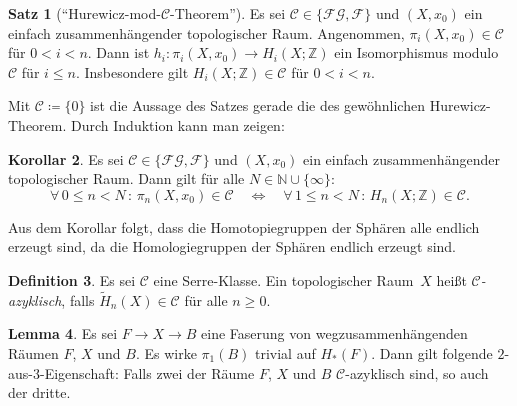 \documentclass[11pt, a4paper, german]{article}
\theoremstyle{definition}
\newtheorem{lem}{Lemma}
\newtheorem{satz}[lem]{Satz}
\newtheorem{defn}[lem]{Definition}
\newtheorem{kor}[lem]{Korollar}
\theoremstyle{remark}
\newcommand{\N}{\mathbb{N}} %
\newcommand{\Z}{\mathbb{Z}} %
\newcommand{\fa}[1]{\forall \, {#1} \,:\,}
\newcommand{\SC}{\mathcal{C}} %
\newcommand{\FG}{\mathcal{FG}} %
\newcommand{\F}{\mathcal{F}} %
\begin{document}
\begin{satz}["`Hurewicz-mod-$\SC$-Theorem"']\label{hurewicz-mod-c}
  Es sei $\SC \in \{ \FG, \F \}$ und
  $(X, x_0)$ ein einfach zusammenhängender topologischer Raum.
  Angenommen, $\pi_i(X, x_0) \in \SC$ für $0 < i < n$.
  Dann ist $h_i : \pi_i(X, x_0) \to H_i(X; \Z)$ ein Isomorphismus modulo $\SC$ für $i \leq n$.
  Insbesondere gilt $H_i(X; \Z) \in \SC$ für $0 < i < n$.
\end{satz}

Mit $\SC \coloneqq \{ 0 \}$ ist die Aussage des Satzes gerade die des gewöhnlichen Hurewicz-Theorem.
Durch Induktion kann man zeigen:

\begin{kor}\label{homotopy-in-c-iff-homology-in-c}
  Es sei $\SC \in \{ \FG, \F \}$ und
  $(X, x_0)$ ein einfach zusammenhängender topologischer Raum.
  Dann gilt für alle $N \in \N \cup \{ \infty \}$:
  \[
    \fa{0 \leq n < N} \pi_n(X, x_0) \in \SC
    \quad \iff \quad
    \fa{1 \leq n < N} H_n(X; \Z) \in \SC.
  \]
\end{kor}

Aus dem Korollar folgt, dass die Homotopiegruppen der Sphären alle endlich erzeugt sind, da die Homologiegruppen der Sphären endlich erzeugt sind.

\begin{defn}
  Es sei $\SC$ eine Serre-Klasse.
  Ein topologischer Raum~$X$ heißt \emph{$\SC$-azyklisch}, falls $\widetilde{H}_n(X) \in \SC$ für alle $n \geq 0$.
\end{defn}

\begin{lem}\label{two-of-three}
  Es sei $F \to X \to B$ eine Faserung von wegzusammenhängenden Räumen $F$, $X$ und $B$.
  Es wirke $\pi_1(B)$ trivial auf $H_*(F)$.
  Dann gilt folgende $2$-aus-$3$-Eigenschaft: Falls zwei der Räume $F$, $X$ und $B$ $\SC$-azyklisch sind, so auch der dritte.
\end{lem}
\end{document}
